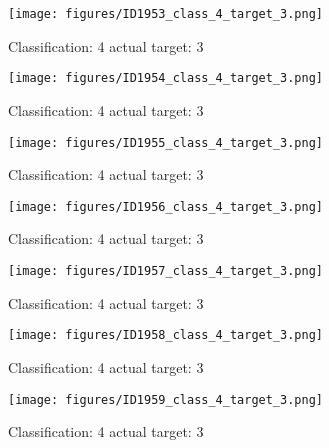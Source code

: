 \begin{figure}[h!]
\begin{center}
\texttt{[image: figures/ID1953\_class\_4\_target\_3.png]}
\end{center}
\caption{ Classification: 4 actual target: 3}
\label{fig:ID1953_class_4_target_3}
\end{figure}
\begin{figure}[h!]
\begin{center}
\texttt{[image: figures/ID1954\_class\_4\_target\_3.png]}
\end{center}
\caption{ Classification: 4 actual target: 3}
\label{fig:ID1954_class_4_target_3}
\end{figure}
\begin{figure}[h!]
\begin{center}
\texttt{[image: figures/ID1955\_class\_4\_target\_3.png]}
\end{center}
\caption{ Classification: 4 actual target: 3}
\label{fig:ID1955_class_4_target_3}
\end{figure}
\begin{figure}[h!]
\begin{center}
\texttt{[image: figures/ID1956\_class\_4\_target\_3.png]}
\end{center}
\caption{ Classification: 4 actual target: 3}
\label{fig:ID1956_class_4_target_3}
\end{figure}
\begin{figure}[h!]
\begin{center}
\texttt{[image: figures/ID1957\_class\_4\_target\_3.png]}
\end{center}
\caption{ Classification: 4 actual target: 3}
\label{fig:ID1957_class_4_target_3}
\end{figure}
\begin{figure}[h!]
\begin{center}
\texttt{[image: figures/ID1958\_class\_4\_target\_3.png]}
\end{center}
\caption{ Classification: 4 actual target: 3}
\label{fig:ID1958_class_4_target_3}
\end{figure}
\begin{figure}[h!]
\begin{center}
\texttt{[image: figures/ID1959\_class\_4\_target\_3.png]}
\end{center}
\caption{ Classification: 4 actual target: 3}
\label{fig:ID1959_class_4_target_3}
\end{figure}
